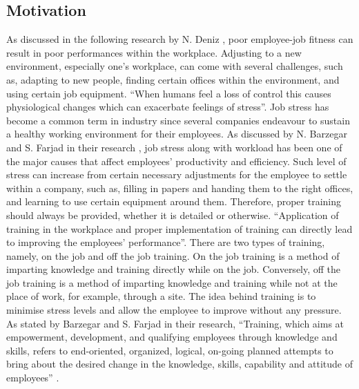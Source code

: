 \documentclass{aifyp}
\begin{document}
\subsection{Motivation}
As discussed in the following research by N. Deniz \cite{DENIZ2015369}, poor employee-job fitness can result in poor performances within the workplace. Adjusting to a new environment, especially one’s workplace, can come with several challenges, such as, adapting to new people, finding certain offices within the environment, and using certain job equipment. ``When humans feel a loss of control this causes physiological changes which can exacerbate feelings of stress”\cite{DENIZ2015369}. Job stress has become a common term in industry since several companies endeavour to sustain a healthy working environment for their employees. As discussed by N. Barzegar and S. Farjad in their research \cite{VIJAYANMATHANGI2}, job stress along with workload has been one of the major causes that affect employees' productivity and efficiency.
\newline
\newline
\indent Such level of stress can increase from certain necessary adjustments for the employee to settle within a company, such as, filling in papers and handing them to the right offices, and learning to use certain equipment around them. Therefore, proper training should always be provided, whether it is detailed or otherwise. ``Application of training in the workplace and proper implementation of training can directly lead to improving the employees' performance”\cite{BARZEGAR20111942}.
\newline
\newline
\indent There are two types of training, namely, on the job and off the job training. On the job training is a method of imparting knowledge and training directly while on the job. Conversely, off the job training is a method of imparting knowledge and training while not at the place of work, for example, through a site. The idea behind training is to minimise stress levels and allow the employee to improve without any pressure. As stated by Barzegar and S. Farjad in their research, ``Training, which aims at empowerment, development, and qualifying employees through knowledge and skills, refers to end-oriented, organized, logical, on-going planned attempts to bring about the desired change in the knowledge, skills, capability and attitude of employees” \cite{BARZEGAR20111942}.
\end{document}
